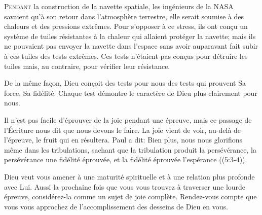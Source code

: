 \dvrule






\lettrine{P}{endant} la construction de la navette spatiale,
 les ingénieurs de la NASA savaient qu'à son retour
 dans l'atmosphère terrestre, elle serait soumise à des chaleurs
 et des pressions extrêmes.
 Pour s'opposer à ce stress, ils ont con\c{c}u un système de tuiles
 résistantes à la chaleur qui allaient protéger la navette;
 mais ils ne pouvaient pas envoyer la navette dans l'espace
 sans avoir auparavant fait subir à ces tuiles des tests extrêmes.
 Ces tests n'étaient pas con\c{c}us pour détruire les tuiles mais,
 au contraire, pour vérifier leur résistance. 

De la même fa\c{c}on, Dieu con\c{c}oit des tests pour nous \ocadr des tests
 qui prouvent Sa force, Sa fidélité. Chaque test démontre
 le caractère de Dieu plus clairement pour nous. 


Il n'est pas facile d'éprouver de la joie pendant une épreuve,
 mais ce passage de l'Écriture nous dit que nous devons le faire.
 La joie vient de voir, au-delà de l'épreuve, le fruit qui en résultera.
 Paul a dit: 
 \Og Bien plus, nous nous glorifions même dans les tribulations,
 sachant que la tribulation produit la persévérance,
 la persévérance une fidélité éprouvée,
 et la fidélité éprouvée l'espérance \Fg{} ((5:3-4)). 

Dieu veut vous amener à une maturité spirituelle et à une relation
 plus profonde avec Lui. Aussi la prochaine fois que vous vous trouvez
 à traverser une lourde épreuve, considérez-la 
 comme un sujet de joie complète.
 Rendez-vous compte que vous vous approchez de l'accomplissement
 des desseins de Dieu en vous. 

\dvrule



